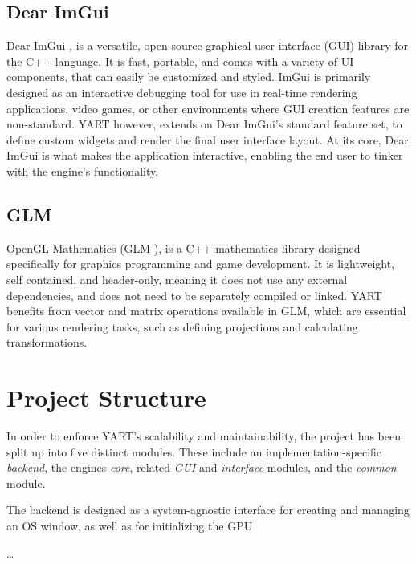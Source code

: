 \subsection{Dear ImGui}

Dear ImGui \supercite{DearImGui}, is a versatile, open-source graphical user interface (GUI) library for the C++ language. 
It is fast, portable, and comes with a variety of UI components, that can easily be customized and styled.
ImGui is primarily designed as an interactive debugging tool for use in real-time rendering applications, video games, or other environments where GUI creation features are non-standard.
YART however, extends on Dear ImGui's standard feature set, to define custom widgets and render the final user interface layout. 
At its core, Dear ImGui is what makes the application interactive, enabling the end user to tinker with the engine's functionality.

\subsection{GLM}

OpenGL Mathematics (GLM \supercite{GLM}), is a C++ mathematics library designed specifically for graphics programming and game development.
It is lightweight, self contained, and header-only, meaning it does not use any external dependencies, and does not need to be separately compiled or linked.
YART benefits from vector and matrix operations available in GLM, which are essential for various rendering tasks, such as defining projections and calculating transformations.

\section{Project Structure}

In order to enforce YART's scalability and maintainability, the project has been split up into five distinct modules. 
These include an implementation-specific \textit{backend}, the engines \textit{core}, related \textit{GUI} and \textit{interface} modules, and the \textit{common} module.

The backend is designed as a system-agnostic interface for creating and managing an OS window, as well as for initializing the GPU 

\dots
